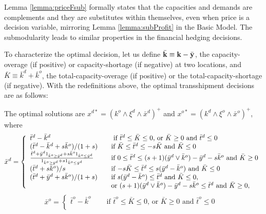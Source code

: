 \documentclass[mnsc,nonblindrev,copyedit]{informs2_wz} %
\begin{document}
Lemma \ref{lemma:priceFsub} formally states that the capacities and demands are complements and they are substitutes within themselves, even when price is a decision variable, mirroring Lemma \ref{lemma:subProfit} in the Basic Model.  The submodularity leads to similar properties in the financial hedging decisions.

To characterize the optimal decision, let us define $\bar{\bold k} \equiv \bold k-\bar{\bold y}$, the capacity-overage (if positive) or capacity-shortage (if negative) at two locations, and $\bar{K} \equiv \bar{k}^d + \bar{k}^o$, the total-capacity-overage (if positive) or the total-capacity-shortage (if negative).  With the redefinitions above, the optimal transshipment decisions are as follows:


{\theorem The optimal solutions are $x^{d*} = (k^o\wedge \xi^d \wedge \bar{x}^d)^+$ and $x^{o*} = (k^d\wedge \xi^o \wedge \bar{x}^o)^+$, where
\begin{equation}
\bar{x}^d = \left\{
  \begin{array} {ll}
  \bar{t}^d -\bar{k}^d \quad & \mbox{ if $\bar{t}^d \leq \bar{K}\leq 0$, or $\bar{K}\geq 0$ and $\bar{t}^d \leq 0$  } \\
(\bar{t}^d  - \bar{k}^d +s\bar{k}^o)/(1+s)  \quad  & \mbox{if $
\bar{K} \leq  \bar{t}^d \leq -s\bar{K}$ and $\bar{K}\leq 0$ }\\
\frac{\bar{t}^d  + \bar{y}^d1_{\bar{k}^o \geq
\bar{y}^d}+s\bar{k}^o1_{\bar{k}^o \leq \bar{y}^d}}{1_{\bar{k}^o
\geq \bar{y}^d}+s1_{\bar{k}^o \leq \bar{y}^d}} \quad  & \mbox{if
$0 \leq \bar{t}^d \leq (s+1)(\bar{y}^d\vee \bar{k}^o)-\bar{y}^d -
s\bar{k}^o$ and $\bar{K}\geq 0$}\\
(\bar{t}^d  +s\bar{k}^o)/s \quad  & \mbox{if $ -s\bar{K} \leq
\bar{t}^d \leq  s(\bar{y}^d - \bar{k}^o)$ and $\bar{K}\leq 0$} \\
(\bar{t}^d  + \bar{y}^d+s\bar{k}^o)/(1+s) \quad  & \mbox{if $
s(\bar{y}^d - \bar{k}^o) \leq \bar{t}^d $ and $\bar{K}\leq 0$}, \\
\quad  & \mbox{or $ (s+1)(\bar{y}^d\vee \bar{k}^o)-\bar{y}^d -
s\bar{k}^o \leq \bar{t}^d $ and $\bar{K}\geq 0$}, \end{array}
\right. \label{eqn:barXd}
\end{equation}
\begin{equation}
\bar{x}^o = \left\{
  \begin{array} {ll}
  \bar{t}^o -\bar{k}^o \quad & \mbox{ if $\bar{t}^o \leq \bar{K}\leq 0$, or $\bar{K}\geq 0$ and $\bar{t}^o \leq 0$  } \\

\end{array}
\end{equation}}
\end{document}
